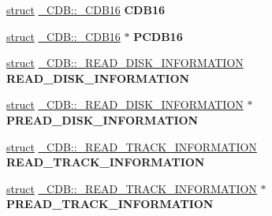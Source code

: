 \begin{DoxyCompactItemize}
\mbox{\label{union___c_d_b_a13a92ff7cd8262c1cb26622dc1367549}} 
\hyperlink{interfacestruct}{struct} \hyperlink{struct___c_d_b_1_1___c_d_b16}{\+\_\+\+C\+D\+B\+::\+\_\+\+C\+D\+B16} {\bfseries C\+D\+B16}
\item 
\mbox{\label{union___c_d_b_a65d165dfde04e7c65dfd7825913b44cc}} 
\hyperlink{interfacestruct}{struct} \hyperlink{struct___c_d_b_1_1___c_d_b16}{\+\_\+\+C\+D\+B\+::\+\_\+\+C\+D\+B16} $\ast$ {\bfseries P\+C\+D\+B16}
\item 
\mbox{\label{union___c_d_b_afcd542399d608b193a751fc301f8cb56}} 
\hyperlink{interfacestruct}{struct} \hyperlink{struct___c_d_b_1_1___r_e_a_d___d_i_s_k___i_n_f_o_r_m_a_t_i_o_n}{\+\_\+\+C\+D\+B\+::\+\_\+\+R\+E\+A\+D\+\_\+\+D\+I\+S\+K\+\_\+\+I\+N\+F\+O\+R\+M\+A\+T\+I\+ON} {\bfseries R\+E\+A\+D\+\_\+\+D\+I\+S\+K\+\_\+\+I\+N\+F\+O\+R\+M\+A\+T\+I\+ON}
\item 
\mbox{\label{union___c_d_b_a22ad8889492a6f4b8426ed8d02b11508}} 
\hyperlink{interfacestruct}{struct} \hyperlink{struct___c_d_b_1_1___r_e_a_d___d_i_s_k___i_n_f_o_r_m_a_t_i_o_n}{\+\_\+\+C\+D\+B\+::\+\_\+\+R\+E\+A\+D\+\_\+\+D\+I\+S\+K\+\_\+\+I\+N\+F\+O\+R\+M\+A\+T\+I\+ON} $\ast$ {\bfseries P\+R\+E\+A\+D\+\_\+\+D\+I\+S\+K\+\_\+\+I\+N\+F\+O\+R\+M\+A\+T\+I\+ON}
\item 
\mbox{\label{union___c_d_b_aa018ef8f0e8d12e0cc09b32ce0f29bbb}} 
\hyperlink{interfacestruct}{struct} \hyperlink{struct___c_d_b_1_1___r_e_a_d___t_r_a_c_k___i_n_f_o_r_m_a_t_i_o_n}{\+\_\+\+C\+D\+B\+::\+\_\+\+R\+E\+A\+D\+\_\+\+T\+R\+A\+C\+K\+\_\+\+I\+N\+F\+O\+R\+M\+A\+T\+I\+ON} {\bfseries R\+E\+A\+D\+\_\+\+T\+R\+A\+C\+K\+\_\+\+I\+N\+F\+O\+R\+M\+A\+T\+I\+ON}
\item 
\mbox{\label{union___c_d_b_a8192b829ffc914f56ee4938acf26d793}} 
\hyperlink{interfacestruct}{struct} \hyperlink{struct___c_d_b_1_1___r_e_a_d___t_r_a_c_k___i_n_f_o_r_m_a_t_i_o_n}{\+\_\+\+C\+D\+B\+::\+\_\+\+R\+E\+A\+D\+\_\+\+T\+R\+A\+C\+K\+\_\+\+I\+N\+F\+O\+R\+M\+A\+T\+I\+ON} $\ast$ {\bfseries P\+R\+E\+A\+D\+\_\+\+T\+R\+A\+C\+K\+\_\+\+I\+N\+F\+O\+R\+M\+A\+T\+I\+ON}
\item 
\mbox{\label{union___c_d_b_a0b6c0e7880071881703165f8b6cb9ea2}} 

\end{DoxyCompactItemize}
